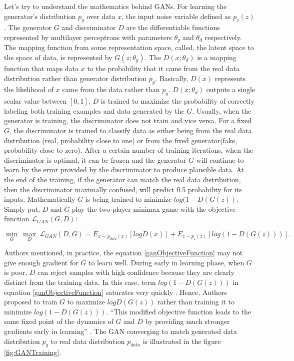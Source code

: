 Let's try to understand the mathematics behind \acp{GAN}. For learning the generator’s distribution $p_g$ over data $x$, the input noise variable defined as $p_z(z)$. The generator $G$ and discriminator $D$ are the differentiable functions represented by multilayer perceptrons with parameters $\theta_g$ and $\theta_d$ respectively. The mapping function from some representation space, called, the latent space to the space of data, is represented by $G(z; \theta_g)$. The $D(x; \theta_d)$ is a mapping function that maps data $x$ to the probability that it came from the real data distribution rather than generator distribution $p_g$. Basically, $D(x)$ represents the likelihood of $x$ came from the data rather than $p_g$. $D(x; \theta_d)$ outputs a single scalar value between $[0,1]$. $D$ is trained to maximize the probability of correctly labeling both training examples and data generated by the $G$. Usually, when the generator is training, the discriminator does not train and vice versa. For a fixed $G$, the discriminator is trained to classify data as either being from the real data distribution (real, probability close to one) or from the fixed generator(fake, probability close to zero). After a certain number of training iterations, when the discriminator is optimal, it can be frozen and the generator $G$ will continue to learn by the error provided by the discriminator to produce plausible data. At the end of the training, if the generator can match the real data distribution, then the discriminator maximally confused, will predict 0.5 probability for its inputs. Mathematically $G$ is being trained to minimize $log(1 - D(G(z))$. Simply put, $D$ and $G$ play the two-player minimax game with the objective function $\mathcal{L}_{GAN}(G, D)$:


\begin{equation}\label{ganObjectiveFunction}
\underset{G}{\min}\ \underset{D}{\max}\ \mathcal{L}_{GAN}(D, G) = E_{x\sim p_{data}(x)}[log D(x)] + E_{z\sim p_z(z)}[log(1 - D(G(z)))].
\end{equation}


Authors mentioned, in practice, the equation \ref{ganObjectiveFunction} may not give enough gradient for $G$ to learn well. During early in learning phase, when $G$ is poor, $D$ can reject samples with high confidence because they are clearly distinct from the training data. In this case, term $log(1 - D(G(z)))$ in equation \ref{ganObjectiveFunction} saturates very quickly \cite{goodfellow2014generative}. Hence, Authors proposed to train $G$ to maximize $log D(G(z))$ rather than training it to minimize $log(1 - D(G(z)))$. ``This modified objective function leads to the same fixed point of the dynamics of $G$ and $D$ by providing much stronger gradients early in learning'' \cite{goodfellow2014generative}. The \ac{GAN} converging to match generated data distribution $p_g$ to real data distribution $p_{data}$ is illustrated in the figure \ref{fig:GANTraining}.

